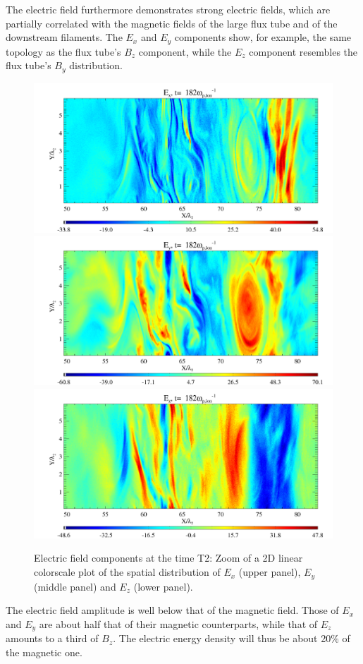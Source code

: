 \documentclass[structabstract]{aa}
\begin{document}
The electric field furthermore demonstrates strong electric fields, which are partially correlated with 
the magnetic fields of the large flux tube and of the downstream filaments. The $E_x$ and $E_y$ components 
show, for example, the same topology as the flux tube's $B_z$ component, while the $E_z$ component resembles 
the flux tube's $B_y$ distribution.
\begin{figure}[t]
\centering
\includegraphics[width=\columnwidth]{1529415a.png}
\includegraphics[width=\columnwidth]{1529415b.png}
\includegraphics[width=\columnwidth]{1529415c.png}
\caption{Electric field components at the time T2: Zoom of a 2D linear colorscale plot of the spatial distribution 
of $E_x$ (upper panel), $E_y$ (middle panel) and $E_z$ (lower panel).}
\label{FigZoomET2}
\end{figure}
The electric field amplitude is well below that of the magnetic field. Those of $E_x$ and $E_y$ are about half that of
their magnetic counterparts, while that of $E_z$ amounts to a third of $B_z$. The electric energy density will
thus be about 20\% of the magnetic one.
\end{document}
